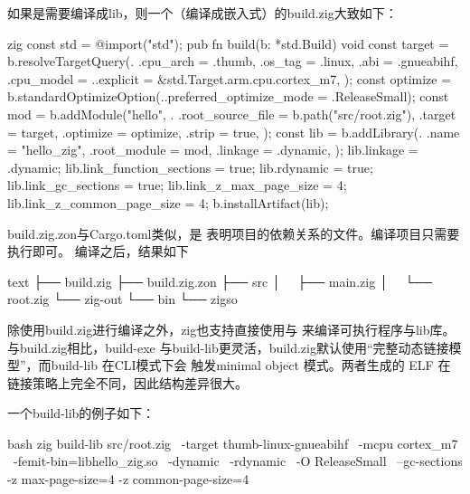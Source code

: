 如果是需要编译成lib，则一个（编译成嵌入式）的build.zig大致如下：
\begin{code-block}{zig}
const std = @import("std");
pub fn build(b: *std.Build) void {
    const target = b.resolveTargetQuery(.{
        .cpu_arch = .thumb,
        .os_tag = .linux,
        .abi = .gnueabihf,
        .cpu_model = .{.explicit = &std.Target.arm.cpu.cortex_m7},
    });
    const optimize = b.standardOptimizeOption(.{.preferred_optimize_mode = .ReleaseSmall});
    const mod = b.addModule("hello", .{
        .root_source_file = b.path("src/root.zig"),
        .target = target,
        .optimize = optimize,
        .strip = true,
    });
    const lib = b.addLibrary(.{
        .name = "hello_zig",
        .root_module = mod,
        .linkage = .dynamic,
    });
    lib.linkage = .dynamic;
    lib.link_function_sections = true;
    lib.rdynamic = true;
    lib.link_gc_sections = true;
    lib.link_z_max_page_size = 4;
    lib.link_z_common_page_size = 4;
    b.installArtifact(lib);
}
\end{code-block}

build.zig.zon与Cargo.toml类似，是
表明项目的依赖关系的文件。编译项目只需要执行即可。
编译之后，结果如下
\begin{code-block}{text}
├── build.zig
├── build.zig.zon
├── src
│   ├── main.zig
│   └── root.zig
└── zig-out
    └── bin
        └── zigso
\end{code-block}

除使用build.zig进行编译之外，zig也支持直接使用与
来编译可执行程序与lib库。与build.zig相比，build-exe
与build-lib更灵活，build.zig默认使用“完整动态链接模型”，而build-lib 在CLI模式下会
触发minimal object 模式。两者生成的 ELF 在 链接策略上完全不同，因此结构差异很大。

一个build-lib的例子如下：
\begin{code-block}{bash}
zig build-lib src/root.zig \
  -target thumb-linux-gnueabihf \
  -mcpu cortex_m7 \
  -femit-bin=libhello_zig.so \
  -dynamic \
  -rdynamic \
  -O ReleaseSmall \
  --gc-sections -z max-page-size=4 -z common-page-size=4
\end{code-block}

